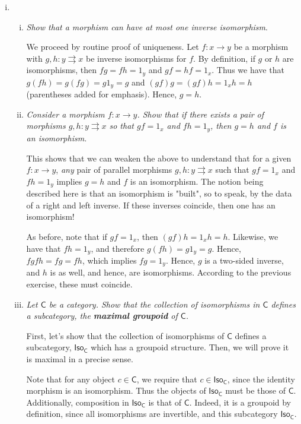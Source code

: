 \documentclass[10pt, oneside]{article}   	%
\newcommand{\cat}[1]{\bm{ \mathsf{#1} }}
\newcommand{\cc}{\cat{C}}
\newcommand{\subcat}[2]{\bm{ \mathsf{#1}}_{\bm{ \mathsf{#2}}}}
\begin{document}
\begin{enumerate}[i.]
\item 

\begin{enumerate}[(i)] 
\item \textit{Show that a morphism can have at most one inverse isomorphism}. 

We proceed by routine proof of uniqueness. Let $f : x \to y$ be a morphism with $g, h : y \rightrightarrows x$ be inverse isomorphisms for $f$. By definition, if $g$ or $h$ are isomorphisms, then $fg = fh = 1_y$ and $gf = hf = 1_x$. Thus we have that 
$g(fh) = g(fg) = g1_y = g$ and $(gf)g = (gf)h = 1_xh = h$ (parentheses added for emphasis). Hence, $g = h$.

\item \textit{Consider a morphism $f : x \to y$. Show that if there exists a pair of morphisms $g, h: y \rightrightarrows x$ so that $gf = 1_x$ and $fh = 1_y$, then $g = h$ and $f$ is an isomorphism.}

This shows that we can weaken the above to understand that for a given $f: x \to y$, \textit{any} pair of parallel morphisms $g,h: y \rightrightarrows x$ such that $gf = 1_x$ and $fh = 1_y$ implies $g = h$ and $f$ is an isomorphism. The notion being described here is that an isomorphism is "built", so to speak, by the data of a right and left inverse. If these inverses coincide, then one has an isomorphism! 

As before, note that if $gf = 1_x$, then $(gf)h = 1_x h = h$. Likewise, we have that $fh = 1_y$, and therefore $g(fh) = g1_y = g$. Hence, $fgfh = fg = fh$, which implies $fg = 1_y$. Hence, $g$ is a two-sided inverse, and $h$ is as well, and hence, are isomorphisms. According to the previous exercise, these must coincide.

\item \textit{Let $\cc$ be a category. Show that the collection of isomorphisms in $\cc$ defines a subcategory, the \textbf{maximal groupoid} of $\cc$.} 

First, let's show that the collection of isomorphisms of $\cc$ defines a subcategory, $\subcat{Iso}{C}$ which has a groupoid structure. Then, we will prove it is maximal in a precise sense. 

Note that for any object $c \in \cc$, we require that $c \in  \subcat{Iso}{C}$, since the identity morphism is an isomorphism. Thus the objects of $\subcat{Iso}{C}$ must be those of $\cc$. Additionally, composition in $\subcat{Iso}{C}$ is that of $\cc$. Indeed, it is a groupoid by definition, since all isomorphisms are invertible, and this subcategory $\subcat{Iso}{C}$.


\end{enumerate}
\end{enumerate}
\end{document}
